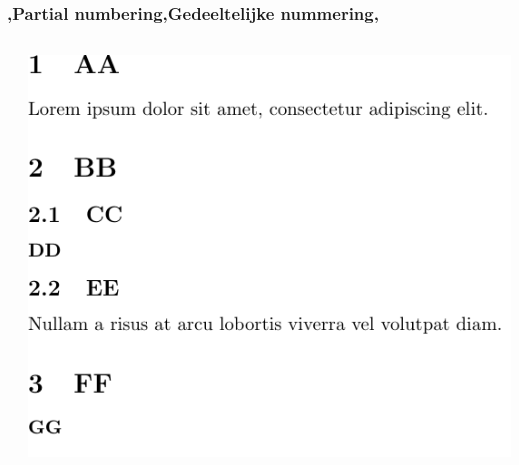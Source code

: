 \begin{frame}
    \frametitle{\lang,Partial numbering,Gedeeltelijke nummering,}
    
    \begin{columns}
        \begin{column}{0.5\textwidth}
        \end{column}
        \begin{column}{0.5\textwidth}
            \includegraphics[width=\linewidth,height=0.8\textheight,keepaspectratio]{assets/partialNumberedSecnumdepth2.pdf}
        \end{column}
    \end{columns}
\end{frame}

